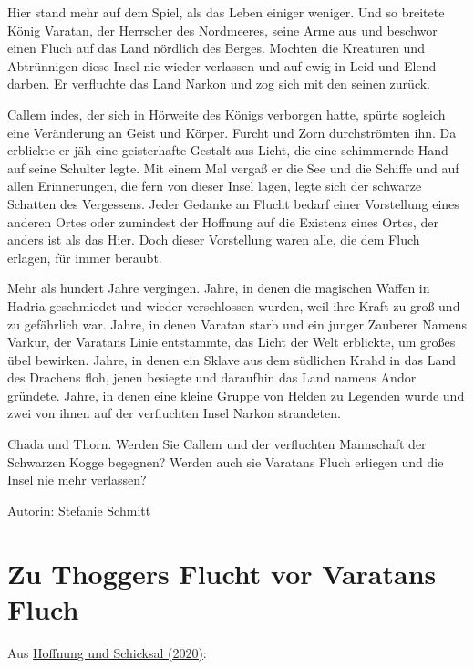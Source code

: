 \documentclass[10pt, a4paper, oneside]{book}
\newcommand{\refstorytext}[1]{\hyperref[Storytext: #1]{#1}}
\begin{document}
\begin{multicols}{2}
Hier stand mehr auf dem Spiel, als das Leben einiger weniger. Und so breitete König Varatan, der Herrscher des Nordmeeres, seine Arme aus und beschwor einen Fluch auf das Land nördlich des Berges. Mochten die Kreaturen und Abtrünnigen diese Insel nie wieder verlassen und auf ewig in Leid und Elend darben. Er verfluchte das Land Narkon und zog sich mit den seinen zurück.\bigskip

Callem indes, der sich in Hörweite des Königs verborgen hatte, spürte sogleich eine Veränderung an Geist und Körper. Furcht und Zorn durchströmten ihn. Da erblickte er jäh eine geisterhafte Gestalt aus Licht, die eine schimmernde Hand auf seine Schulter legte. Mit einem Mal vergaß er die See und die Schiffe und auf allen Erinnerungen, die fern von dieser Insel lagen, legte sich der schwarze Schatten des Vergessens. Jeder Gedanke an Flucht bedarf einer Vorstellung eines anderen Ortes oder zumindest der Hoffnung auf die Existenz eines Ortes, der anders ist als das Hier. Doch dieser Vorstellung waren alle, die dem Fluch erlagen, für immer beraubt.\bigskip

Mehr als hundert Jahre vergingen. Jahre, in denen die magischen Waffen in Hadria geschmiedet und wieder verschlossen wurden, weil ihre Kraft zu groß und zu gefährlich war. Jahre, in denen Varatan starb und ein junger Zauberer Namens Varkur, der Varatans Linie entstammte, das Licht der Welt erblickte, um großes übel bewirken. Jahre, in denen ein Sklave aus dem südlichen Krahd in das Land des Drachens floh,  jenen besiegte und daraufhin das Land namens Andor gründete. Jahre, in denen eine kleine Gruppe von Helden zu Legenden wurde und zwei von ihnen auf der verfluchten Insel Narkon strandeten.\bigskip

Chada und Thorn. Werden Sie Callem und der verfluchten Mannschaft der Schwarzen Kogge begegnen? Werden auch sie Varatans Fluch erliegen und die Insel nie mehr verlassen?\bigskip

Autorin: Stefanie Schmitt



\section{Zu Thoggers Flucht vor Varatans Fluch}

\begin{center}
    Aus \refstorytext{Hoffnung und Schicksal (2020)}:
\end{center}


\end{multicols}
\end{document}
